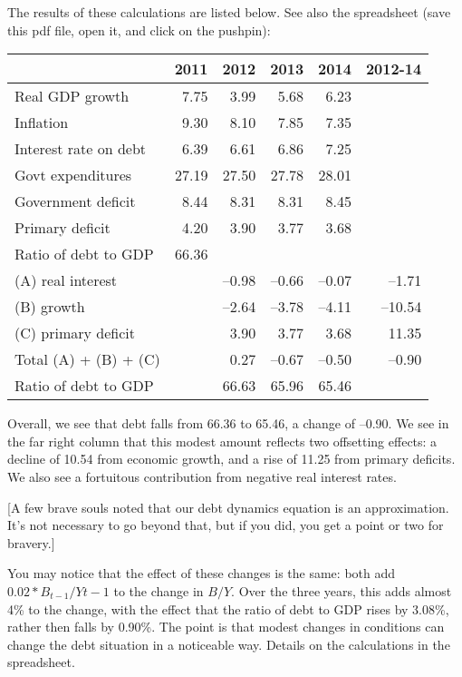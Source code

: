 \documentclass[12pt]{exam}
\begin{document}
\begin{questions}
\begin{solution}
\begin{parts}
The results of these calculations are listed below.
See also the spreadsheet (save this pdf file, open it, and click on the pushpin):
%
\begin{center}
\begin{tabular}{lrrrrr}
\toprule
         & 2011 &  2012  &  2013 & 2014  & 2012-14\\%
\midrule
Real GDP growth 	& 7.75 & 3.99 & 5.68 & 6.23 \\
Inflation 			& 9.30 & 8.10 &	7.85 & 7.35 \\
Interest rate on debt & 6.39 & 6.61 & 6.86 & 7.25 \\
Govt expenditures  & 27.19 & 27.50 & 27.78 & 28.01 \\
Government deficit  & 8.44 & 8.31 & 8.31 & 8.45 \\
Primary deficit 	& 4.20 & 3.90 & 3.77 & 3.68 \\
Ratio of debt to GDP  & 66.36	\\ %
\midrule
(A) real interest & & --0.98 & --0.66 & --0.07 & --1.71 \\
(B) growth        & & --2.64 & --3.78 & --4.11 & --10.54 \\
(C) primary deficit & & 3.90 & 3.77	& 3.68 & 11.35 \\
\midrule
Total (A) + (B) + (C) & & 0.27 & --0.67 & --0.50 & --0.90 \\
Ratio of debt to GDP & & 66.63 & 65.96 & 65.46 \\
\bottomrule
\end{tabular}
\end{center}
\medskip

Overall, we see that debt falls from 66.36 to 65.46, a change of --0.90.
We see in the far right column that this modest amount reflects two offsetting
effects:  a decline of 10.54 from economic growth, and a rise of 11.25 from
primary deficits.
We also see a fortuitous contribution from negative real interest rates.

[A few brave souls noted that our debt dynamics equation is an approximation.
It's not necessary to go beyond that, but if you did, you get
a point or two for bravery.]

\item You may notice that the effect of these changes is the same:
both add $0.02*B_{t-1}/Y{t-1} $ to the change in $B/Y$.
Over the three years, this adds almost 4\% to the change,
with the effect that the ratio of debt to GDP rises by 3.08\%,
rather then falls by 0.90\%.
The point is that modest changes in conditions can change the debt situation in
a noticeable way.
Details on the calculations in the spreadsheet.


\end{parts}
\end{solution}
\end{questions}
\end{document}
